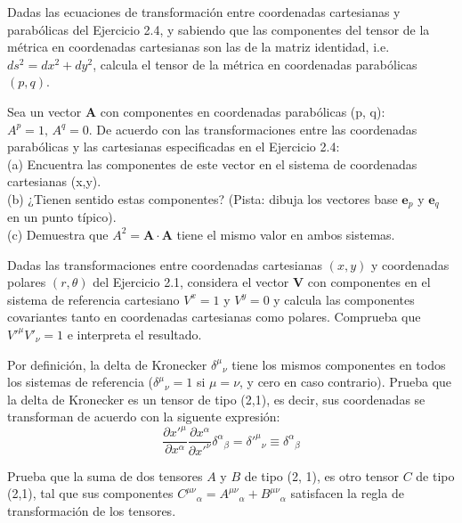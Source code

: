\documentclass[12pt]{article}
\newenvironment{exercise}[2][Ejercicio]{\begin{trivlist} 
\item[\hskip \labelsep {\bfseries #1}\hskip \labelsep {\bfseries #2.}]}{\end{trivlist}}
\begin{document}
\begin{exercise}{2.5}
Dadas las ecuaciones de transformación entre coordenadas cartesianas y parabólicas del Ejercicio 2.4, y sabiendo que las componentes del tensor de la métrica en coordenadas cartesianas son las de la matriz identidad, i.e. $ds^2=dx^2+dy^2$, calcula el tensor de la métrica en coordenadas parabólicas $(p,q)$.    
\end{exercise}

\begin{exercise}{2.6}
Sea un vector \textbf{A} con componentes en coordenadas parabólicas (p, q): $A^p=1,\,A^q=0$. De acuerdo con las transformaciones entre las coordenadas parabólicas y las cartesianas especificadas en el Ejercicio 2.4:
\\(a) Encuentra las componentes de este vector en el sistema de coordenadas cartesianas (x,y).
\\(b) ¿Tienen sentido estas componentes? (Pista: dibuja los vectores base $\textbf{e}_p$ y $\textbf{e}_q$ en un punto típico).
\\(c) Demuestra que $A^2=\textbf{A}\cdot\textbf{A}$ tiene el mismo valor en ambos sistemas.  
\end{exercise}

\begin{exercise}{2.7}
Dadas las transformaciones entre coordenadas cartesianas $(x, y)$ y coordenadas polares $(r, \theta)$ del Ejercicio 2.1, considera el vector \textbf{V} con componentes en el sistema de referencia cartesiano $V^x=1$ y $V^y=0$ y calcula las componentes covariantes tanto en coordenadas cartesianas como polares. Comprueba que $V'^\mu V'_\nu = 1$ e interpreta el resultado.
\end{exercise}

\begin{exercise}{2.8}
Por definición, la delta de Kronecker $\delta^{\mu}{}_{\nu}$ tiene los mismos componentes en todos los sistemas de referencia ($\delta^{\mu}{}_{\nu}=1$ si $\mu=\nu$, y cero en caso contrario). Prueba que la delta de Kronecker es un tensor de tipo (2,1), es decir, sus coordenadas se transforman de acuerdo con la siguente expresión:
\[
\frac{\partial{x'^\mu}}{\partial{x^\alpha}}\frac{\partial{x^\alpha}}{\partial{x'^\nu}}\delta^{\alpha}{}_{\beta}=\delta'^{\mu}{}_{\nu}\equiv\delta^{\alpha}{}_{\beta}
\]
\end{exercise}

\begin{exercise}{2.9}
Prueba que la suma de dos tensores $A$ y $B$ de tipo (2, 1), es otro tensor $C$ de tipo (2,1), tal que sus componentes $C^{\mu\nu}{}{}_{\alpha}=A^{\mu\nu}{}{}_{\alpha} + B^{\mu\nu}{}{}_{\alpha}$ satisfacen la regla de transformación de los tensores.
\end{exercise}
\end{document}
